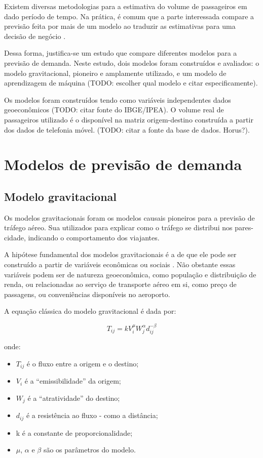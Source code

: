 \documentclass[12pt]{article}
\providecommand{\tightlist}{%
  \setlength{\itemsep}{0pt}\setlength{\parskip}{0pt}}
\begin{document}
Existem diversas metodologias para a estimativa do volume de passageiros
em dado período de tempo. Na prática, é comum que a parte interessada
compare a previsão feita por mais de um modelo ao traduzir as
estimativas para uma decisão de negócio \citep{Grosche2007}.

Dessa forma, justifica-se um estudo que compare diferentes modelos para
a previsão de demanda. Neste estudo, dois modelos foram construídos e
avaliados: o modelo gravitacional, pioneiro e amplamente utilizado, e um
modelo de aprendizagem de máquina (TODO: escolher qual modelo e citar
especificamente).

Os modelos foram construídos tendo como variáveis independentes dados
geoeconômicos (TODO: citar fonte do IBGE/IPEA). O volume real de
passageiros utilizado é o disponível na matriz origem-destino construída
a partir dos dados de telefonia móvel. (TODO: citar a fonte da base de
dados. Horus?).

\hypertarget{modelos-de-previsuxe3o-de-demanda}{%
\section{Modelos de previsão de
demanda}\label{modelos-de-previsuxe3o-de-demanda}}

\hypertarget{modelo-gravitacional}{%
\subsection{Modelo gravitacional}\label{modelo-gravitacional}}

Os modelos gravitacionais foram os modelos causais pioneiros para a
previsão de tráfego aéreo. Sua utilizados para explicar como o tráfego
se distribui nos pares-cidade, indicando o comportamento dos viajantes.

A hipótese fundamental dos modelos gravitacionais é a de que ele pode
ser construído a partir de variáveis econômicas ou sociais
\citep{Grosche2007}. Não obstante essas variáveis podem ser de natureza
geoeconômica, como população e distribuição de renda, ou relacionadas ao
serviço de transporte aéreo em si, como preço de passagens, ou
conveniências disponíveis no aeroporto.

A equação clássica do modelo gravitacional é dada por:

\[T_{ij} = k V_i^\mu W_j^\alpha d_{ij}^{-\beta} \]

onde:

\begin{itemize}
\tightlist
\item
  \(T_{ij}\) é o fluxo entre a origem e o destino;
\item
  \(V_i\) é a \enquote{emissibilidade} da origem;
\item
  \(W_j\) é a \enquote{atratividade} do destino;
\item
  \(d_{ij}\) é a resistência ao fluxo - como a distância;
\item
  k é a constante de proporcionalidade;
\item
  \(\mu\), \(\alpha\) e \(\beta\) são os parâmetros do modelo.
\end{itemize}
\end{document}
